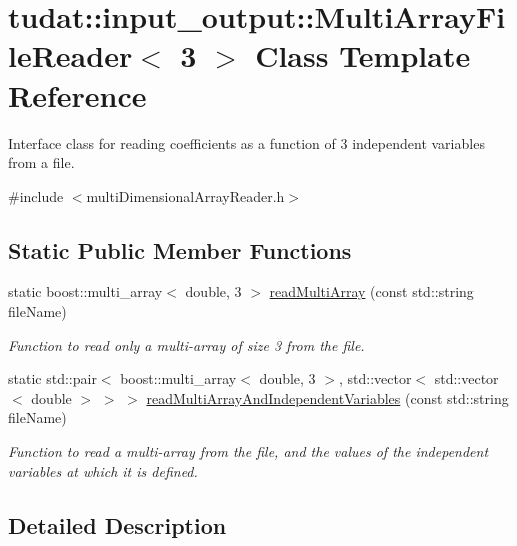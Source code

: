 \hypertarget{classtudat_1_1input__output_1_1MultiArrayFileReader_3_013_01_4}{}\section{tudat\+:\+:input\+\_\+output\+:\+:Multi\+Array\+File\+Reader$<$ 3 $>$ Class Template Reference}
\label{classtudat_1_1input__output_1_1MultiArrayFileReader_3_013_01_4}


Interface class for reading coefficients as a function of 3 independent variables from a file.  




{\ttfamily \#include $<$multi\+Dimensional\+Array\+Reader.\+h$>$}

\subsection*{Static Public Member Functions}
\begin{DoxyCompactItemize}
\item 
static boost\+::multi\+\_\+array$<$ double, 3 $>$ \hyperlink{classtudat_1_1input__output_1_1MultiArrayFileReader_3_013_01_4_a60426a144e25388d92070923363c383b}{read\+Multi\+Array} (const std\+::string file\+Name)
\begin{DoxyCompactList}\small\item\em Function to read only a multi-\/array of size 3 from the file. \end{DoxyCompactList}\item 
static std\+::pair$<$ boost\+::multi\+\_\+array$<$ double, 3 $>$, std\+::vector$<$ std\+::vector$<$ double $>$ $>$ $>$ \hyperlink{classtudat_1_1input__output_1_1MultiArrayFileReader_3_013_01_4_a6ab39e60c3d4febe0a46009baf6ae1a8}{read\+Multi\+Array\+And\+Independent\+Variables} (const std\+::string file\+Name)
\begin{DoxyCompactList}\small\item\em Function to read a multi-\/array from the file, and the values of the independent variables at which it is defined. \end{DoxyCompactList}\end{DoxyCompactItemize}


\subsection{Detailed Description}
